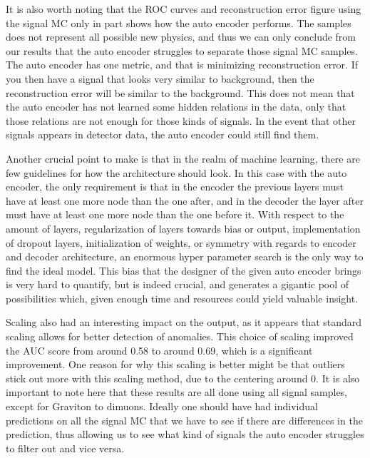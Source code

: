 \documentclass[ reprint, amsmath,amssymb, aps, nofootinbib]{revtex4-2}
\begin{document}
It is also worth noting that the ROC curves and reconstruction error figure using the signal MC only in part shows how the auto encoder performs. The samples does not represent all possible new physics, and thus we can only conclude from our results that the auto encoder struggles to separate those signal MC samples. The auto encoder has one metric, and that is minimizing reconstruction error. If you then have a signal that looks very similar to background, then the reconstruction error will be similar to the background. This does not mean that the auto encoder has not learned some hidden relations in the data, only that those relations are not enough for those kinds of signals. In the event that other signals appears in detector data, the auto encoder could still find them. \par \par

Another crucial point to make is that in the realm of machine learning, there are few guidelines for how the architecture should look. In this case with the auto encoder, the only requirement is that in the encoder the previous layers must have at least one more node than the one after, and in the decoder the layer after must have at least one more node than the one before it. With respect to the amount of layers, regularization of layers towards bias or output, implementation of dropout layers, initialization of weights, or symmetry with regards to encoder and decoder architecture, an enormous hyper parameter search is the only way to find the ideal model. This bias that the designer of the given auto encoder brings is very hard to quantify, but is indeed crucial, and generates a gigantic pool of possibilities which, given enough time and resources could yield valuable insight. \par \par

Scaling also had an interesting impact on the output, as it appears that standard scaling allows for better detection of anomalies. This choice of scaling improved the AUC score from around 0.58 to around 0.69, which is a significant improvement. One reason for why this scaling is better might be that outliers stick out more with this scaling method, due to the centering around 0. It is also important to note here that these results are all done using all signal samples, except for Graviton to dimuons. Ideally one should have had individual predictions on all the signal MC that we have to see if there are differences in the prediction, thus allowing us to see what kind of signals the auto encoder struggles to filter out and vice versa. \par \par
\end{document}
